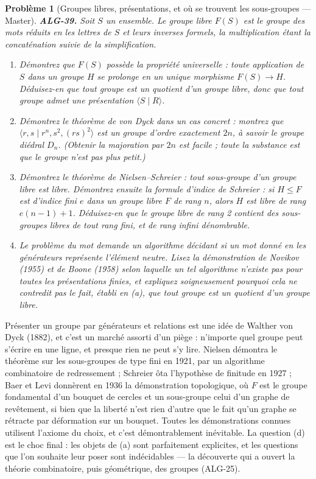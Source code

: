\documentclass[11pt]{article}
\newtheorem{problem}{Problème}
\begin{document}
\bigskip

\begin{problem}[{Groupes libres, présentations, et où se trouvent les sous-groupes --- Master}]
\textbf{ALG-39.} Soit $S$ un ensemble. Le \textit{groupe libre} $F(S)$ est le groupe des mots
réduits en les lettres de $S$ et leurs inverses formels, la multiplication étant la concaténation suivie de
la simplification.
\begin{enumerate}
\item[(a)] Démontrez que $F(S)$ possède la propriété universelle : toute application de $S$ dans un groupe
$H$ se prolonge en un unique morphisme $F(S) \to H$. Déduisez-en que tout groupe est un quotient d'un
groupe libre, donc que tout groupe admet une présentation $\langle S \mid R \rangle$.
\item[(b)] Démontrez le théorème de von Dyck dans un cas concret : montrez que
$\langle r, s \mid r^{n}, s^{2}, (rs)^{2} \rangle$ est un groupe d'ordre exactement $2n$, à savoir
le groupe diédral $D_n$. (Obtenir la majoration par $2n$ est facile ; toute la substance est que le
groupe n'est pas plus petit.)
\item[(c)] Démontrez le théorème de Nielsen--Schreier : tout sous-groupe d'un groupe libre est libre. Démontrez
ensuite la formule d'indice de Schreier : si $H \le F$ est d'indice fini $e$ dans un groupe libre $F$
de rang $n$, alors $H$ est libre de rang $e(n-1) + 1$. Déduisez-en que le groupe libre de rang 2
contient des sous-groupes libres de tout rang fini, et de rang infini dénombrable.
\item[(d)] Le problème du mot demande un algorithme décidant si un mot donné en les générateurs représente
l'élément neutre. Lisez la démonstration de Novikov (1955) et de Boone (1958) selon laquelle un tel
algorithme n'existe pas pour toutes les présentations finies, et expliquez soigneusement pourquoi cela ne
contredit pas le fait, établi en (a), que tout groupe est un quotient d'un groupe libre.
\end{enumerate}

\end{problem}

\noindent Présenter un groupe par générateurs et relations est une idée de Walther von Dyck
(1882), et c'est un marché assorti d'un piège : n'importe quel groupe peut s'écrire en une ligne, et presque
rien ne peut s'y lire. Nielsen démontra le théorème sur les sous-groupes de type fini en 1921, par un
algorithme combinatoire de redressement ; Schreier ôta l'hypothèse de finitude en 1927 ; Baer et Levi
donnèrent en 1936 la démonstration topologique, où $F$ est le groupe fondamental d'un bouquet de cercles et
un sous-groupe celui d'un graphe de revêtement, si bien que la liberté n'est rien d'autre que le fait qu'un
graphe se rétracte par déformation sur un bouquet. Toutes les démonstrations connues utilisent l'axiome du
choix, et c'est démontrablement inévitable. La question (d) est le choc final : les objets de (a) sont
parfaitement explicites, et les questions que l'on souhaite leur poser sont indécidables --- la découverte qui
a ouvert la théorie combinatoire, puis géométrique, des groupes (ALG-25).
\end{document}
